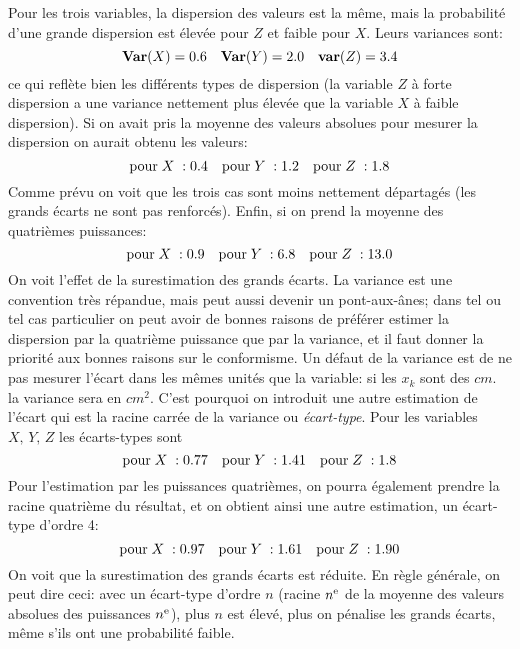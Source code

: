 Pour les trois variables, la dispersion des valeurs est la m\^eme, mais la
probabilit\'e d'une grande dispersion est \'elev\'ee pour $Z$ et faible pour 
$X$. Leurs variances sont:
$${\bf Var} (X) = 0.6 \quad {\bf Var} (Y) = 2.0 \quad 
{\bf var} (Z) = 3.4$$
ce qui refl\`ete bien les diff\'erents types de dispersion (la variable $Z$ 
\`a forte dispersion a une variance nettement plus \'elev\'ee que la
variable $X$ \`a faible dispersion). Si on avait pris la moyenne des valeurs
absolues pour mesurer la dispersion on aurait obtenu les valeurs:
$$\hbox{pour} \; X \; : 0.4 \quad \hbox{pour} \; Y \; : 1.2 \quad 
\hbox{pour} \; Z \; : 1.8$$
Comme pr\'evu on voit que les trois cas sont moins nettement 
d\'epartag\'es (les grands \'ecarts ne sont pas renforc\'es). Enfin, si on
prend la moyenne des quatri\`emes puissances:
$$\hbox{pour} \; X \; : 0.9 \quad \hbox{pour} \; Y \; : 6.8 \quad 
\hbox{pour} \; Z \; : 13.0$$
On voit l'effet de la surestimation des grands \'ecarts.
La variance est une convention tr\`es r\'epandue, mais peut aussi devenir 
un pont-aux-\^anes; dans tel ou tel cas particulier on peut avoir de bonnes
raisons de pr\'ef\'erer estimer la dispersion par la quatri\`eme puissance 
que par la variance, et il faut donner la priorit\'e aux bonnes raisons sur 
le conformisme.
\medskip
Un d\'efaut de la variance est de ne pas mesurer l'\'ecart dans les m\^emes
unit\'es que la variable: si les $x_k$ sont des $cm.$ la variance sera en 
$cm^2$. C'est pourquoi on introduit une autre estimation de l'\'ecart qui est 
la racine carr\'ee de la variance ou {\it \'ecart-type}. Pour les variables
$X,\,  Y,\, Z$ les \'ecarts-types sont
$$\hbox{pour} \; X \; : 0.77 \quad \hbox{pour} \; Y \; : 1.41 \quad 
\hbox{pour} \; Z \; : 1.8$$
Pour l'estimation par les puissances quatri\`emes, on pourra \'egalement
prendre la racine quatri\`eme du r\'esultat, et on obtient ainsi une autre
estimation,  un {\og \'ecart-type d'ordre 4\fg}:
$$\hbox{pour} \; X \; : 0.97 \quad \hbox{pour} \; Y \; : 1.61 \quad 
\hbox{pour} \; Z \; : 1.90$$
On voit que la surestimation des grands \'ecarts est r\'eduite. En r\`egle
g\'en\'erale, on peut dire ceci: avec un \'ecart-type d'ordre $n$  (racine
$n^{\rm e}$ de la moyenne des valeurs absolues des puissances  $n^{\rm
e}$), plus $n$ est \'elev\'e, plus on p\'enalise les grands \'ecarts, m\^eme
s'ils ont une probabilit\'e faible.

\medskip

